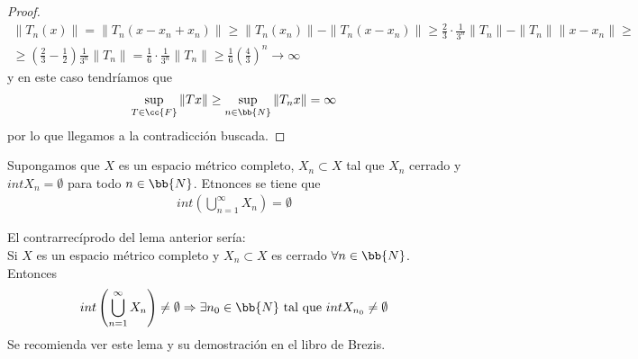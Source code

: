 \begin{prop}
\begin{proof}
\begin{gather*}
            \|T_n(x)\| = \| T_n(x-x_n+x_n)\| \geq \|T_n(x_n)\| - \|T_n(x-x_n)\| \geq \frac{2}{3} \cdot \frac{1}{3^n} \|T_n\| - \|T_n\|\|x - x_n\| \geq \\
            \geq \left(\frac{2}{3} - \frac{1}{2} \right) \frac{1}{3^n} \|T_n\| = \frac{1}{6} \cdot \frac{1}{3^n} \|T_n\| \geq \frac{1}{6}\left(\frac{4}{3}\right)^n \to \infty
        \end{gather*}
        y en este caso tendríamos que
        \begin{gather*}
            \sup_{T\in \cc{F}} \|Tx\| \geq \sup_{n\in \bb{N}} \|T_nx\| = \infty
        \end{gather*}
        por lo que llegamos a la contradicción buscada.
    \end{proof}
\end{prop}

\begin{lema} 
    Supongamos que $X$ es un espacio métrico completo, $X_n\subset X$ tal que $X_n$ cerrado y $int X_n = \emptyset$ para todo $n\in \bb{N}$. Etnonces se tiene que
    \begin{gather*}
        int \left(\bigcup\limits_{n=1}^\infty X_n\right) = \emptyset
    \end{gather*}
\end{lema}

\begin{observacion}
    El contrarrecíprodo del lema anterior sería:\\
    Si $X$ es un espacio métrico completo y $X_n\subset X$ es cerrado $\forall n\in \bb{N}$. Entonces
    \begin{gather*}
        int \left(\bigcup\limits_{n=1}^\infty X_n\right) \neq \emptyset \Rightarrow \exists n_0\in \bb{N} \text{ tal que } intX_{n_0}\neq \emptyset
    \end{gather*}
    Se recomienda ver este lema y su demostración en el libro de Brezis.
\end{observacion}









